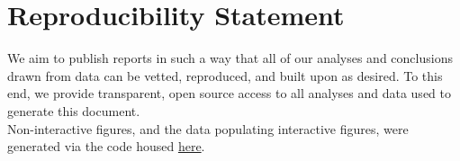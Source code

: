 \documentclass[12pt, a4paper,twoside]{report}
\theoremstyle{plain} %
\theoremstyle{definition} %
\theoremstyle{remark} %
\numberwithin{equation}{chapter}
\begin{document}
		\chapter{Reproducibility Statement}\label{reproducibilitystatement}
		
		\hspace{1em} We aim to publish reports in such a way that all of our analyses and conclusions drawn from data can be vetted, reproduced, and built upon as desired. To this end, we provide transparent, open source access to all analyses and data used to generate this document.\\
		
		Non-interactive figures, and the data populating interactive figures, were generated via the code housed \href{https://github.com/TPAFS/investigations/tree/initial_denial_investigation/investigations/claims_denials}{here}.
		
		

		
		
		
		
		
	
\end{document}
